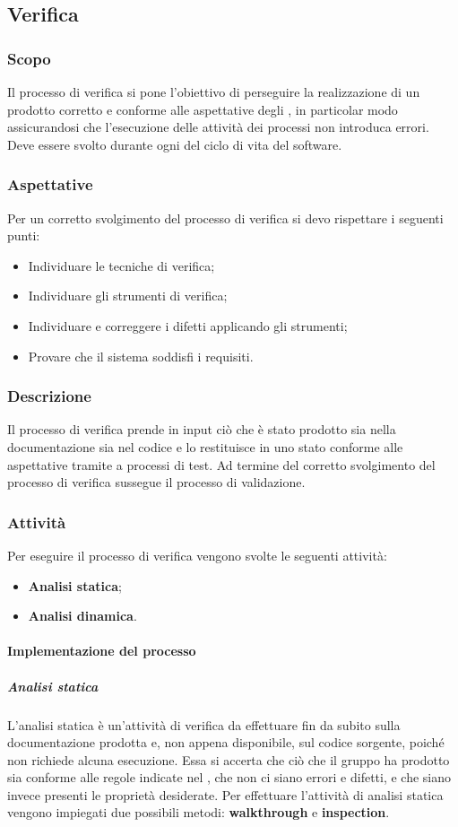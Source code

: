 \subsection{Verifica}
\subsubsection{Scopo}
Il processo di verifica si pone l’obiettivo di perseguire la realizzazione di un prodotto corretto e conforme alle aspettative degli , in particolar modo assicurandosi che l'esecuzione delle attività dei processi non introduca errori.
Deve essere svolto durante ogni  del ciclo di vita del software.
\subsubsection{Aspettative}
Per un corretto svolgimento del processo di verifica si devo rispettare i seguenti punti:
\begin{itemize} 
    \item Individuare le tecniche di verifica;
    \item Individuare gli strumenti di verifica;
    \item Individuare e correggere i difetti applicando gli strumenti;
    \item Provare che il sistema soddisfi i requisiti.
\end{itemize}
\subsubsection{Descrizione}
Il processo di verifica prende in input ciò che è stato prodotto sia nella documentazione sia nel codice e lo restituisce in uno stato conforme alle aspettative tramite a processi di test. Ad termine del corretto svolgimento del processo di verifica sussegue il processo di validazione.
\subsubsection{Attività}
Per eseguire il processo di verifica vengono svolte le seguenti attività:
\begin{itemize} 
    \item \textbf{Analisi statica};
    \item \textbf{Analisi dinamica}.
\end{itemize}
\paragraph{Implementazione del processo}
\subparagraph*{Analisi statica} 
L'analisi statica è un'attività di verifica da effettuare fin da subito sulla documentazione prodotta e, non appena disponibile, sul codice sorgente, poiché non richiede alcuna esecuzione.
Essa si accerta che ciò che il gruppo ha prodotto sia conforme alle regole indicate nel \PdQ{}, che non ci siano errori e difetti, e che siano invece presenti le proprietà desiderate.
Per effettuare l’attività di analisi statica vengono impiegati due possibili metodi: \textbf{walkthrough} e \textbf{inspection}.

